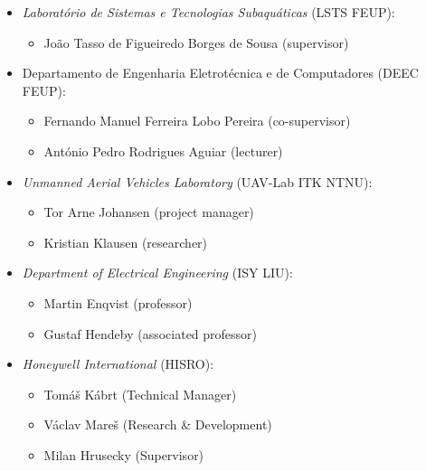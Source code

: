 \begin{itemize}
    \item \emph{Laboratório de Sistemas e Tecnologias Subaquáticas} (LSTS FEUP):
    \begin{itemize}
        \item João Tasso de Figueiredo Borges de Sousa (supervisor)
    \end{itemize}
    
    \item Departamento de Engenharia Eletrotécnica e de Computadores (DEEC FEUP):
    \begin{itemize}
        \item Fernando Manuel Ferreira Lobo Pereira (co-supervisor)
        \item António Pedro Rodrigues Aguiar (lecturer)
    \end{itemize}
    
    \item \emph{Unmanned Aerial Vehicles Laboratory} (UAV-Lab ITK NTNU):
    \begin{itemize}
        \item Tor Arne Johansen (project manager)
        \item Kristian Klausen (researcher)
    \end{itemize}
    
    \item \emph{Department of Electrical Engineering} (ISY LIU):
    \begin{itemize}
        \item Martin Enqvist (professor)
        \item Gustaf Hendeby (associated professor)
    \end{itemize}
    
    \item \emph{Honeywell International} (HISRO):
    \begin{itemize}
        \item Tomáš Kábrt (Technical Manager)
        \item Václav Mareš (Research \& Development)
        \item Milan Hrusecky (Supervisor)
    \end{itemize}
\end{itemize}